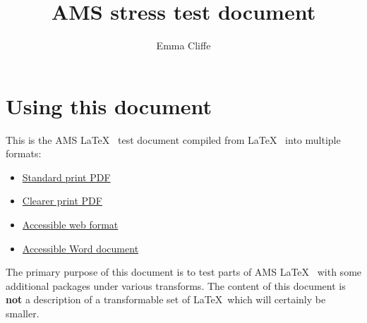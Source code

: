 \documentclass[12pt,a4paper]{article}
\title{AMS stress test document}
\author{Emma Cliffe}
\theoremstyle{clearprint}
\begin{document}
\maketitle

\tableofcontents
\listoffigures
\listoftables
\newpage

\setcounter{page}{1}

\section*{Using this document}

This is the AMS \LaTeX~ test document compiled from \LaTeX~ into multiple formats:
\begin{itemize} 
\item \href{https://stem-enable.github.io/LaTeXtoPDFandMathJax-AMSStressTest/LaTeXtoPDFandMathJax-AMSStressTest-standard.pdf}{Standard print PDF}
\item \href{https://stem-enable.github.io/LaTeXtoPDFandMathJax-AMSStressTest/LaTeXtoPDFandMathJax-AMSStressTest-clear.pdf}{Clearer print PDF}
\item \href{https://stem-enable.github.io/LaTeXtoPDFandMathJax-AMSStressTest/}{Accessible web format}
\item \href{https://stem-enable.github.io/LaTeXtoPDFandMathJax-AMSStressTest/LaTeXtoPDFandMathJax-AMSStressTest.docx}{Accessible Word document}
\end{itemize}

The primary purpose of this document is to test parts of AMS \LaTeX~ with some additional packages under various transforms. The content of this document is {\bf not} a description of a transformable set of \LaTeX~which will certainly be smaller.  

\newpage


\end{document}
